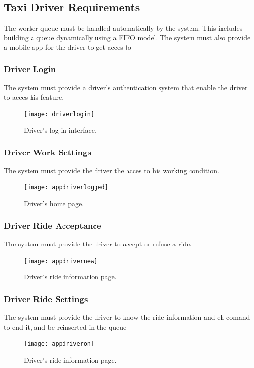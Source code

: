 	\subsection {Taxi Driver Requirements}
		The worker queue must be handled automatically by the system. This includes building a queue dynamically using a FIFO model. The system
		must also provide a mobile app for the driver to get acces to \askpippo
		\subsubsection {Driver Login}
		 	The system must provide a driver's authentication system that enable the driver to acces his feature.
		 	\begin{figure}[h!]
				\texttt{[image: driverlogin]}
				\caption{Driver's log in interface.}
			\end{figure}
			\newpage
		\subsubsection {Driver Work Settings}
		 	The system must provide the driver the acces to his working condition.
		 	\begin{figure}[h!]
				\texttt{[image: appdriverlogged]}
				\caption{Driver's home page.}
			\end{figure}
			\newpage
		\subsubsection {Driver Ride Acceptance}
			The system must provide the driver to accept or refuse a ride.
		 	\begin{figure}[h!]
				\texttt{[image: appdrivernew]}
				\caption{Driver's ride information page.}
			\end{figure}
			\newpage
		\subsubsection {Driver Ride Settings}
			The system must provide the driver to know the ride information and eh comand to end it, and be reinserted \askpippo in the queue.
		 	\begin{figure}[h!]
				\texttt{[image: appdriveron]}
				\caption{Driver's ride information page.}
			\end{figure}
			\newpage



